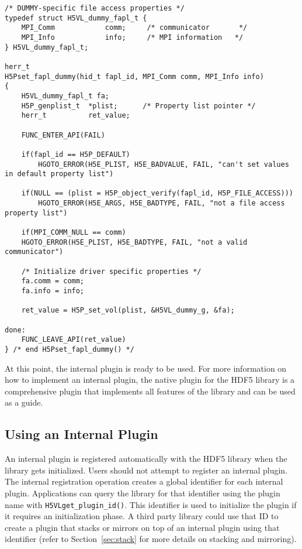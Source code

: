 \begin{lstlisting}
/* DUMMY-specific file access properties */
typedef struct H5VL_dummy_fapl_t {
    MPI_Comm            comm;     /* communicator       */
    MPI_Info            info;     /* MPI information   */
} H5VL_dummy_fapl_t;

herr_t
H5Pset_fapl_dummy(hid_t fapl_id, MPI_Comm comm, MPI_Info info)
{
    H5VL_dummy_fapl_t fa;
    H5P_genplist_t  *plist;      /* Property list pointer */
    herr_t          ret_value;

    FUNC_ENTER_API(FAIL)

    if(fapl_id == H5P_DEFAULT)
        HGOTO_ERROR(H5E_PLIST, H5E_BADVALUE, FAIL, "can't set values in default property list")

    if(NULL == (plist = H5P_object_verify(fapl_id, H5P_FILE_ACCESS)))
        HGOTO_ERROR(H5E_ARGS, H5E_BADTYPE, FAIL, "not a file access property list")

    if(MPI_COMM_NULL == comm)
	HGOTO_ERROR(H5E_PLIST, H5E_BADTYPE, FAIL, "not a valid communicator")

    /* Initialize driver specific properties */
    fa.comm = comm;
    fa.info = info;

    ret_value = H5P_set_vol(plist, &H5VL_dummy_g, &fa);

done:
    FUNC_LEAVE_API(ret_value)
} /* end H5Pset_fapl_dummy() */
\end{lstlisting}

At this point, the internal plugin is ready to be used. For more
information on how to implement an internal plugin, the native plugin
for the HDF5 library is a comprehensive plugin that implements all
features of the library and can be used as a guide.

\subsection{Using an Internal Plugin}
An internal plugin is registered automatically with the HDF5 library when the library gets initialized. Users should not attempt to register an internal plugin. The internal registration operation creates a global identifier for each internal plugin. Applications can query the library for that identifier using the plugin name with {\tt H5VLget\_plugin\_id()}. This identifier is used to initialize the plugin if it requires an initialization phase. A third party library could use that ID to create a plugin that stacks or mirrors on top of an internal plugin using that identifier (refer to Section~\ref{sec:stack} for more details on stacking and mirroring).

